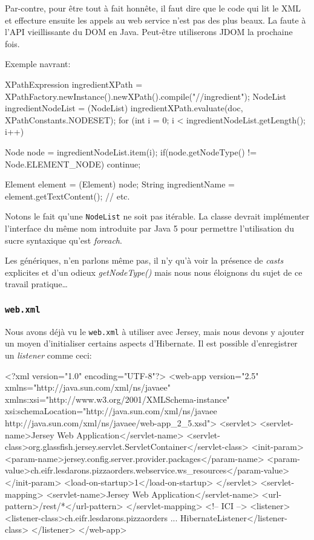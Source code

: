 Par-contre, pour être tout à fait honnête, il faut dire que le code qui lit le XML et effecture
ensuite les appels au web service n'est pas des plus beaux. La faute à l'API vieillissante du DOM en Java.
Peut-être utiliserons JDOM la prochaine fois.

Exemple navrant:

\begin{javacode}
XPathExpression ingredientXPath = XPathFactory.newInstance().newXPath().compile("//ingredient");
NodeList ingredientNodeList = (NodeList) ingredientXPath.evaluate(doc, XPathConstants.NODESET);
for (int i = 0; i < ingredientNodeList.getLength(); i++) {
    Node node = ingredientNodeList.item(i);
    if(node.getNodeType() != Node.ELEMENT_NODE) continue;

    Element element = (Element) node;
    String ingredientName = element.getTextContent();
    // etc.
}
\end{javacode}

Notons le fait qu'une \verb|NodeList| ne soit pas itérable. La classe devrait implémenter l'interface du même nom
introduite par Java 5 pour permettre l'utilisation du sucre syntaxique qu'est \emph{foreach}.

Les génériques, n'en parlons même pas, il n'y qu'à voir la présence de \emph{casts} explicites et 
d'un odieux \emph{getNodeType()} mais nous nous éloignons du sujet de ce travail pratique\dots

\cprotect\subsubsection{\verb|web.xml|}

Nous avons déjà vu le \verb|web.xml| à utiliser avec Jersey, mais nous devons y ajouter
un moyen d'initialiser certains aspects d'Hibernate. Il est possible d'enregistrer
un \emph{listener} comme ceci:

\begin{xmlcode}
<?xml version="1.0" encoding="UTF-8"?>
<web-app version="2.5" xmlns="http://java.sun.com/xml/ns/javaee" 
                       xmlns:xsi="http://www.w3.org/2001/XMLSchema-instance" 
                       xsi:schemaLocation="http://java.sun.com/xml/ns/javaee 
                                           http://java.sun.com/xml/ns/javaee/web-app_2_5.xsd">
    <servlet>
        <servlet-name>Jersey Web Application</servlet-name>
        <servlet-class>org.glassfish.jersey.servlet.ServletContainer</servlet-class>
        <init-param>
            <param-name>jersey.config.server.provider.packages</param-name>
            <param-value>ch.eifr.lesdarons.pizzaorders.webservice.ws_resources</param-value>
        </init-param>
        <load-on-startup>1</load-on-startup>
    </servlet>
    <servlet-mapping>
        <servlet-name>Jersey Web Application</servlet-name>
        <url-pattern>/rest/*</url-pattern>
    </servlet-mapping>
    <!-- ICI -->
    <listener>
        <listener-class>ch.eifr.lesdarons.pizzaorders ... HibernateListener</listener-class>
    </listener>
</web-app>
\end{xmlcode}

